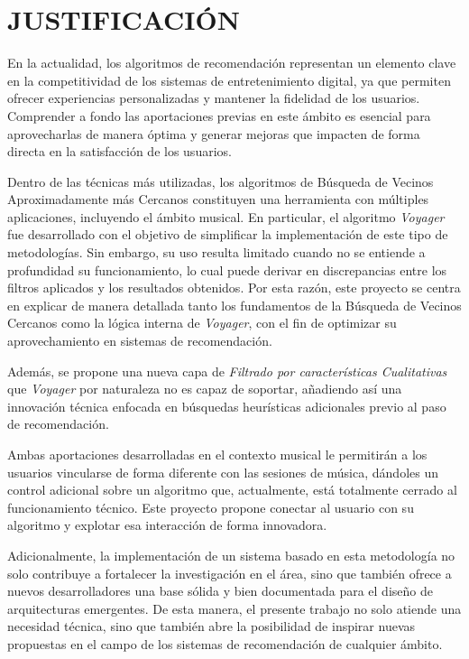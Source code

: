 \newpage
\thispagestyle{plain}
\vspace*{0.2cm}
\section{JUSTIFICACIÓN}
En la actualidad, los algoritmos de recomendación representan un elemento clave en la competitividad de los sistemas de entretenimiento digital, ya que permiten ofrecer experiencias personalizadas y mantener la fidelidad de los usuarios. Comprender a fondo las aportaciones previas en este ámbito es esencial para aprovecharlas de manera óptima y generar mejoras que impacten de forma directa en la satisfacción de los usuarios.

Dentro de las técnicas más utilizadas, los algoritmos de Búsqueda de Vecinos Aproximadamente más Cercanos constituyen una herramienta con múltiples aplicaciones, incluyendo el ámbito musical. En particular, el algoritmo \textit{Voyager} fue desarrollado con el objetivo de simplificar la implementación de este tipo de metodologías. Sin embargo, su uso resulta limitado cuando no se entiende a profundidad su funcionamiento, lo cual puede derivar en discrepancias entre los filtros aplicados y los resultados obtenidos. Por esta razón, este proyecto se centra en explicar de manera detallada tanto los fundamentos de la Búsqueda de Vecinos Cercanos como la lógica interna de \textit{Voyager}, con el fin de optimizar su aprovechamiento en sistemas de recomendación.

Además, se propone una nueva capa de \textit{Filtrado por características Cualitativas} que \textit{Voyager} por naturaleza no es capaz de soportar, añadiendo así una innovación técnica enfocada en búsquedas heurísticas adicionales previo al paso de recomendación.

Ambas aportaciones desarrolladas en el contexto musical le permitirán a los usuarios vincularse de forma diferente con las sesiones de música, dándoles un control adicional sobre un algoritmo que, actualmente, está totalmente cerrado al funcionamiento técnico. Este proyecto propone conectar al usuario con su algoritmo y explotar esa interacción de forma innovadora.

Adicionalmente, la implementación de un sistema basado en esta metodología no solo contribuye a fortalecer la investigación en el área, sino que también ofrece a nuevos desarrolladores una base sólida y bien documentada para el diseño de arquitecturas emergentes. De esta manera, el presente trabajo no solo atiende una necesidad técnica, sino que también abre la posibilidad de inspirar nuevas propuestas en el campo de los sistemas de recomendación de cualquier ámbito.


